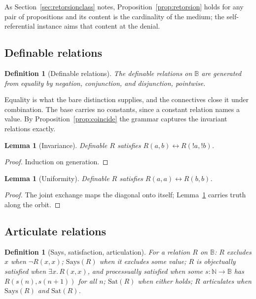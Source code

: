 \documentclass[11pt]{article}
\newtheorem{definition}[theorem]{Definition}
\newtheorem{lemma}[theorem]{Lemma}
\newcommand{\Says}{\mathrm{Says}}
\newcommand{\Sat}{\mathrm{Sat}}
\newcommand{\B}{\mathbb{B}}
\begin{document}
As Section~\ref{sec:retorsionclass} notes, Proposition~\ref{prop:retorsion} holds for any pair of propositions and its content is the cardinality of the medium; the self-referential instance aims that content at the denial.

\subsection{Definable relations}

\begin{definition}[Definable relations]
\label{def:defble}
The \emph{definable} relations on $\B$ are generated from equality by negation, conjunction, and disjunction, pointwise.
\end{definition}

Equality is what the bare distinction supplies, and the connectives close it under combination. The base carries no constants, since a constant relation names a value. By Proposition~\ref{prop:coincide} the grammar captures the invariant relations exactly.

\begin{lemma}[Invariance]
\label{lem:diaginv}
Definable $R$ satisfies $R(a,b) \leftrightarrow R(!a, !b)$.
\end{lemma}

\begin{proof}
Induction on generation.
\end{proof}

\begin{lemma}[Uniformity]
\label{lem:diaguniform}
Definable $R$ satisfies $R(a,a) \leftrightarrow R(b,b)$.
\end{lemma}

\begin{proof}
The joint exchange maps the diagonal onto itself; Lemma~\ref{lem:diaginv} carries truth along the orbit.
\end{proof}

\subsection{Articulate relations}

\begin{definition}[Says, satisfaction, articulation]
\label{def:articulate}
For a relation $R$ on $\B$: $R$ \emph{excludes} $x$ when $\lnot R(x,x)$; $\Says(R)$ when it excludes some value; $R$ is \emph{objectually satisfied} when $\exists x.\, R(x,x)$, and \emph{processually satisfied} when some $s : \mathbb{N} \to \B$ has $R(s(n),s(n+1))$ for all $n$; $\Sat(R)$ when either holds; $R$ \emph{articulates} when $\Says(R)$ and $\Sat(R)$.
\end{definition}
\end{document}
